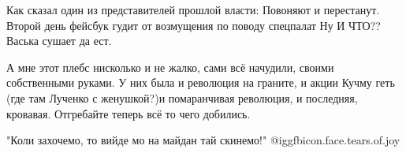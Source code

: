 \begin{itemize}

Как сказал один из представителей прошлой власти: Повоняют и перестанут. Второй
день фейсбук гудит от возмущения по поводу спецпалат Ну И ЧТО?? Васька сушает
да ест.


А мне этот плебс нисколько и не жалко, сами всё начудили, своими собственными
руками. У них была и революция на граните, и акции Кучму геть (где там Лученко с
женушкой?)и помаранчивая революция, и последняя, кровавая. Отгребайте теперь всё
то чего добились.


"Коли захочемо, то вийде
мо на майдан тай скинемо!"  @igg{fbicon.face.tears.of.joy} 

\end{itemize} %
